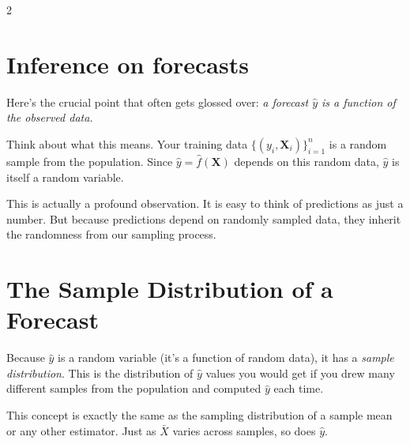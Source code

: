 \documentclass[12pt]{article}
\begin{document}
\begin{multicols}{2}

  \section*{Inference on forecasts}

  Here's the crucial point that often gets glossed over: \emph{a forecast $\hat{y}$ is a function of the observed data.}

  Think about what this means. Your training data $\{ (y_i, \bm{X}_i) \}_{i=1}^n$ is a random sample from the population. Since $\hat{y} = \hat{f}(\bm{X})$ depends on this random data, $\hat{y}$ is itself a random variable.

  This is actually a profound observation.
  It is easy to think of predictions as just a number.
  But because predictions depend on randomly sampled data, they inherit the randomness from our sampling process.

  \section*{The Sample Distribution of a Forecast}

  Because $\hat{y}$ is a random variable (it's a function of random data), it has a \emph{sample distribution}. This is the distribution of $\hat{y}$ values you would get if you drew many different samples from the population and computed $\hat{y}$ each time.

  This concept is exactly the same as the sampling distribution of a sample mean or any other estimator.
  Just as $\bar{X}$ varies across samples, so does $\hat{y}$.


\end{multicols}
\end{document}
